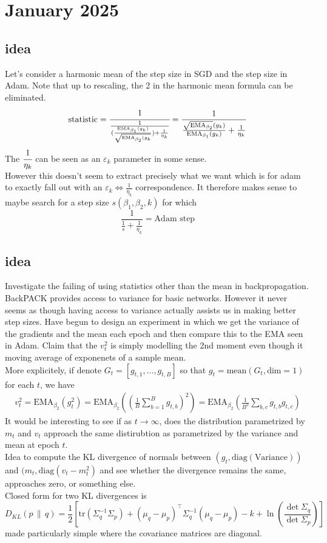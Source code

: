 \documentclass[12pt]{book}
\begin{document}
\section{January 2025}
\subsection*{idea}
Let's consider a harmonic mean of the step size in SGD and the step size in Adam. Note that up to rescaling, the 2 in the harmonic mean formula can be eliminated. 
\begin{align*}
\text{statistic} = \cfrac{1}{\frac{1}{(\frac{\text{EMA}_{\beta_1}(g_k)}{\sqrt{\text{EMA}_{\beta_2}(g_k} }) + \frac{1}{\eta_k}}} = \frac{1}{\frac{\sqrt{\text{EMA}_{\beta_2}}(g_k) }{\text{EMA}_{\beta_1}(g_k)} + \frac{1}{\eta_k}}
\end{align*}
The $\cfrac{1}{\eta_k}$ can be seen as an $\varepsilon_k $ parameter in some sense.\\
However this doesn't seem to extract precisely what we want which is for adam to exactly fall out with an $\varepsilon _k \iff \frac{1}{\eta_k}$ correspondence. It therefore makes sense to maybe search for a step size $s(\beta_1, \beta_2, k)$ for which 
\[
\frac{1}{\frac{1}{s} + \frac{1}{\eta_k}} = \text{Adam step}
\] 
\subsection*{idea}
Investigate the failing of using statistics other than the mean in backpropagation. 
BackPACK provides access to variance for basic networks. However it never seems as though having access to variance actually assists us in making better step sizes. Have begun to design an experiment in which we get the variance of the gradients and the mean each epoch and then compare this to the EMA seen in Adam. Claim that the $v_t^2$ is simply modelling the 2nd moment even though it moving average of exponenets of a sample mean. 
\\
More explicitely, if denote $G_t = \left[ g_{t,1}, \ldots, g_{t, B}  \right] $ so that $g_t = \text{mean}(G_t, \text{dim} = 1) $ for each $t$, we have 
\begin{align*}
v_t^2 = \text{EMA}_{\beta_2}(g_t^2) = \text{EMA}_{\beta_2}\left(\left(  \frac{1}{B}\sum_{b=1}^{B} {g_{t,b}}\right)^2\right) = \text{EMA}_{\beta_2}\left( \frac{1}{B^2} \sum_{b,c}^{} {g_{t,b}g_{t,c}}  \right) 
\end{align*}
It would be interesting to see if as $t\to \infty$, does the distribution parametrized by $m_t$ and  $v_t$ approach the same distirubtion as parametrized by the variance and mean at epoch $t$.
\\
Idea to compute the KL divergence of normals between $(g_t, \text{diag}(\text{Variance}))$ and $(m_t, \text{diag}(v_t - m_t^2)$ and see whether the divergence remains the same, approaches zero, or something else. 
\\
Closed form for two KL divergences is 
\[
D_{KL}(p \,\|\, q) = \frac{1}{2} \left[ \mathrm{tr}(\Sigma_q^{-1} \Sigma_p) + (\mu_q - \mu_p)^\top \Sigma_q^{-1} (\mu_q - \mu_p) - k + \ln\left(\frac{\det\Sigma_q}{\det\Sigma_p}\right) \right]
\] 
made particularly simple where the covariance matrices are diagonal. 
\end{document}
